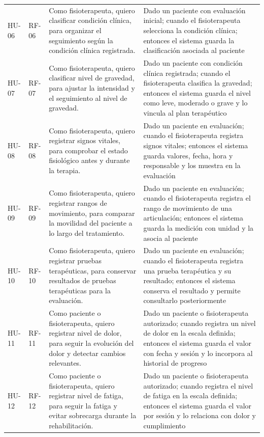 \documentclass[12pt,a4paper]{article}
\begin{document}
\begin{longtable}{p{}p{}p{}p{}}
HU-06 & RF-06 & Como fisioterapeuta, quiero clasificar condición clínica, para organizar el seguimiento según la condición clínica registrada. & Dado un paciente con evaluación inicial; cuando el fisioterapeuta selecciona la condición clínica; entonces el sistema guarda la clasificación asociada al paciente \\
HU-07 & RF-07 & Como fisioterapeuta, quiero clasificar nivel de gravedad, para ajustar la intensidad y el seguimiento al nivel de gravedad. & Dado un paciente con condición clínica registrada; cuando el fisioterapeuta clasifica la gravedad; entonces el sistema guarda el nivel como leve, moderado o grave y lo vincula al plan terapéutico \\
HU-08 & RF-08 & Como fisioterapeuta, quiero registrar signos vitales, para comprobar el estado fisiológico antes y durante la terapia. & Dado un paciente en evaluación; cuando el fisioterapeuta registra signos vitales; entonces el sistema guarda valores, fecha, hora y responsable y los muestra en la evaluación \\
HU-09 & RF-09 & Como fisioterapeuta, quiero registrar rangos de movimiento, para comparar la movilidad del paciente a lo largo del tratamiento. & Dado un paciente en evaluación; cuando el fisioterapeuta registra el rango de movimiento de una articulación; entonces el sistema guarda la medición con unidad y la asocia al paciente \\
HU-10 & RF-10 & Como fisioterapeuta, quiero registrar pruebas terapéuticas, para conservar resultados de pruebas terapéuticas para la evaluación. & Dado un paciente en evaluación; cuando el fisioterapeuta registra una prueba terapéutica y su resultado; entonces el sistema conserva el resultado y permite consultarlo posteriormente \\
HU-11 & RF-11 & Como paciente o fisioterapeuta, quiero registrar nivel de dolor, para seguir la evolución del dolor y detectar cambios relevantes. & Dado un paciente o fisioterapeuta autorizado; cuando registra un nivel de dolor en la escala definida; entonces el sistema guarda el valor con fecha y sesión y lo incorpora al historial de progreso \\
HU-12 & RF-12 & Como paciente o fisioterapeuta, quiero registrar nivel de fatiga, para seguir la fatiga y evitar sobrecarga durante la rehabilitación. & Dado un paciente o fisioterapeuta autorizado; cuando registra el nivel de fatiga en la escala definida; entonces el sistema guarda el valor por sesión y lo relaciona con dolor y cumplimiento \\

\end{longtable}
\end{document}
